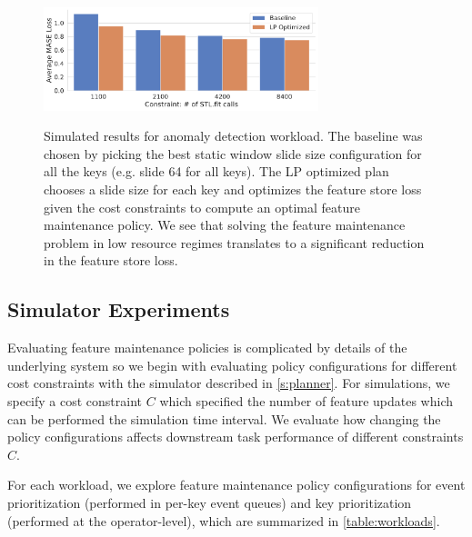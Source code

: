 \begin{figure}[t]
         \centering
         \includegraphics[width=8cm]{ralf/figures/policy_stl_cost.pdf}
         \label{fig:stl-key-sim}
        \caption{Simulated results for anomaly detection workload. The baseline was chosen by picking the best static window slide size configuration for all the keys (e.g. slide 64 for all keys). The LP optimized plan chooses a slide size for each key and optimizes the feature store loss given the cost constraints to compute an optimal feature maintenance policy.  We see that solving the feature maintenance problem in low resource regimes translates to a significant reduction in the feature store loss.}
\end{figure}

\subsection{Simulator Experiments}
Evaluating feature maintenance policies is complicated by details of the underlying system so we begin with evaluating policy configurations for different cost constraints with the simulator described in \cref{s:planner}.  For simulations, we specify a cost constraint $C$ which specified the number of feature updates which can be performed the simulation time interval. We evaluate how changing the policy configurations affects downstream task performance of different constraints $C$.

For each workload, we explore feature maintenance policy configurations for event prioritization (performed in per-key event queues) and key prioritization (performed at the operator-level), which are summarized in \cref{table:workloads}.



